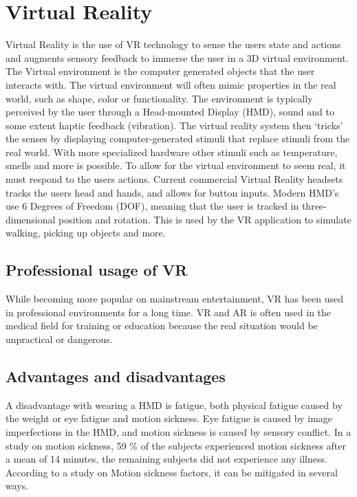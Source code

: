 \documentclass[a4paper]{report}
\begin{document}
\section{Virtual Reality}
Virtual Reality is the use of VR technology to sense the users state and actions and augments sensory feedback to immerse the user in a 3D virtual environment\cite{mihelj_virtual_2014}.
The Virtual environment is the computer generated objects that the user interacts with. The virtual environment will often mimic properties in the real world, such as shape, color or functionality.
The environment is typically perceived by the user through a Head-mounted Display (HMD), sound and to some extent haptic feedback (vibration). The virtual reality system then ‘tricks’ the senses by displaying computer-generated stimuli that replace stimuli from the real world. With more specialized hardware other stimuli such as temperature, smells and more is possible\cite{noauthor_feelreal_nodate}.
To allow for the virtual environment to seem real, it must respond to the users actions. Current commercial Virtual Reality headsets tracks the users head and hands, and allows for button inputs\cite{noauthor_oculus_nodate}. Modern HMD's use 6 Degrees of Freedom (DOF), meaning that the user is tracked in three-dimensional position and rotation\cite{lang_introduction_2013}. This is used by the VR application to simulate walking, picking up objects and more.

\subsection{Professional usage of VR}
While becoming more popular on mainstream entertainment, VR has been used in professional environments for a long time\cite{needed}. VR and AR is often used in the medical field for training or education because the real situation would be unpractical or dangerous\cite{freina_immersive_2015}.

\subsection{Advantages and disadvantages}
A disadvantage with wearing a HMD is fatigue, both physical fatigue caused by the weight or eye fatigue and motion sickness\cite{merhi_motion_2007}.
Eye fatigue is caused by image imperfections in the HMD\cite{kooi_visual_2004}, and motion sickness is caused by sensory conflict.
In a study on motion sickness, 59 \% of the subjects experienced motion sickness after a mean of 14 minutes, the remaining subjects did not experience any illness\cite{kooi_visual_2004}. According to a study on Motion sickness factors, it can be mitigated in several ways.
\end{document}
